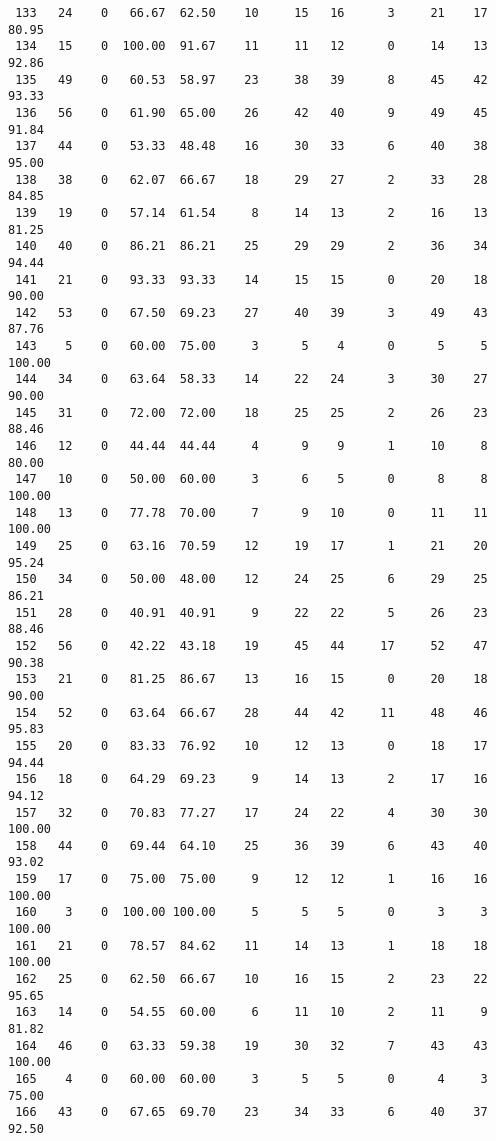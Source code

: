 \begin{verbatim}
 133   24    0   66.67  62.50    10     15   16      3     21    17    80.95
 134   15    0  100.00  91.67    11     11   12      0     14    13    92.86
 135   49    0   60.53  58.97    23     38   39      8     45    42    93.33
 136   56    0   61.90  65.00    26     42   40      9     49    45    91.84
 137   44    0   53.33  48.48    16     30   33      6     40    38    95.00
 138   38    0   62.07  66.67    18     29   27      2     33    28    84.85
 139   19    0   57.14  61.54     8     14   13      2     16    13    81.25
 140   40    0   86.21  86.21    25     29   29      2     36    34    94.44
 141   21    0   93.33  93.33    14     15   15      0     20    18    90.00
 142   53    0   67.50  69.23    27     40   39      3     49    43    87.76
 143    5    0   60.00  75.00     3      5    4      0      5     5   100.00
 144   34    0   63.64  58.33    14     22   24      3     30    27    90.00
 145   31    0   72.00  72.00    18     25   25      2     26    23    88.46
 146   12    0   44.44  44.44     4      9    9      1     10     8    80.00
 147   10    0   50.00  60.00     3      6    5      0      8     8   100.00
 148   13    0   77.78  70.00     7      9   10      0     11    11   100.00
 149   25    0   63.16  70.59    12     19   17      1     21    20    95.24
 150   34    0   50.00  48.00    12     24   25      6     29    25    86.21
 151   28    0   40.91  40.91     9     22   22      5     26    23    88.46
 152   56    0   42.22  43.18    19     45   44     17     52    47    90.38
 153   21    0   81.25  86.67    13     16   15      0     20    18    90.00
 154   52    0   63.64  66.67    28     44   42     11     48    46    95.83
 155   20    0   83.33  76.92    10     12   13      0     18    17    94.44
 156   18    0   64.29  69.23     9     14   13      2     17    16    94.12
 157   32    0   70.83  77.27    17     24   22      4     30    30   100.00
 158   44    0   69.44  64.10    25     36   39      6     43    40    93.02
 159   17    0   75.00  75.00     9     12   12      1     16    16   100.00
 160    3    0  100.00 100.00     5      5    5      0      3     3   100.00
 161   21    0   78.57  84.62    11     14   13      1     18    18   100.00
 162   25    0   62.50  66.67    10     16   15      2     23    22    95.65
 163   14    0   54.55  60.00     6     11   10      2     11     9    81.82
 164   46    0   63.33  59.38    19     30   32      7     43    43   100.00
 165    4    0   60.00  60.00     3      5    5      0      4     3    75.00
 166   43    0   67.65  69.70    23     34   33      6     40    37    92.50

\end{verbatim}
